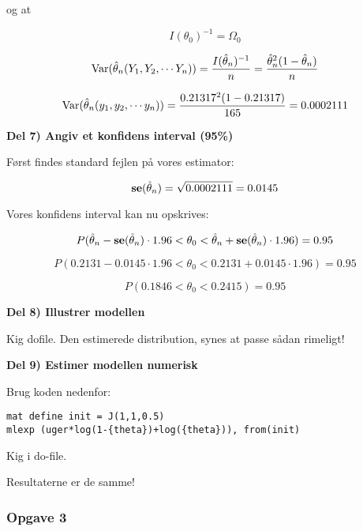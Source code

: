 og at

\begin{equation}
    I(\theta_0)^{-1} = \Omega_0
\end{equation}

\begin{equation}
    \text{Var}(\hat{\theta}_n(Y_1, Y_2, \cdots Y_n)) = \frac{I(\hat{\theta}_n)^{-1}}{n} = \frac{\hat{\theta}_n^2 (1 - \hat{\theta}_n)}{n}
\end{equation}

\begin{equation}
    \text{Var}(\hat{\theta}_n(y_1, y_2, \cdots y_n)) = \frac{0.21317^2(1 - 0.21317)}{165} = 0.0002111
\end{equation}

\textbf{Del 7) Angiv et konfidens interval (95\%)}

Først findes standard fejlen på vores estimator:

\begin{equation}
    \textbf{se}(\hat{\theta}_n) = \sqrt{0.0002111} = 0.0145
\end{equation}

Vores konfidens interval kan nu opskrives:

\begin{equation}
    P(\hat{\theta}_n - \textbf{se}(\hat{\theta}_n)\cdot 1.96  < \theta_0 < \hat{\theta}_n + \textbf{se}(\hat{\theta}_n)\cdot 1.96 ) = 0.95
\end{equation}

\begin{equation}
    P(0.2131 - 0.0145 \cdot 1.96 < \theta_0 < 0.2131 + 0.0145 \cdot 1.96) = 0.95
\end{equation}

\begin{equation}
    P( 0.1846 < \theta_0 < 0.2415) = 0.95
\end{equation}

\textbf{Del 8) Illustrer modellen}

Kig dofile. Den estimerede distribution, synes at passe sådan rimeligt!

\textbf{Del 9) Estimer modellen numerisk}

Brug koden nedenfor:

\begin{verbatim}
mat define init = J(1,1,0.5)
mlexp (uger*log(1-{theta})+log({theta})), from(init)
\end{verbatim}

Kig i do-file.

Resultaterne er de samme!

\subsubsection{Opgave 3}

